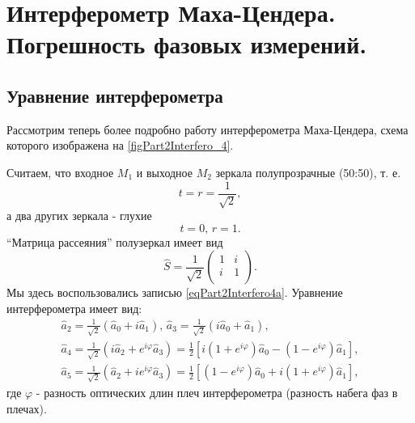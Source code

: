 \section{Интерферометр Маха-Цендера. Погрешность фазовых измерений.}
\subsection{Уравнение интерферометра}
Рассмотрим теперь более подробно работу интерферометра Маха-Цендера,
схема которого изображена на \autoref{figPart2Interfero_4}.



Считаем, что входное $M_1$ и выходное $M_2$ зеркала полупрозрачные
(50:50), т. е. 
\[
t = r = \frac{1}{\sqrt{2}},
\]
а два других зеркала - глухие
\[
t = 0, \, r = 1.
\]
``Матрица рассеяния'' полузеркал имеет вид 
\begin{equation}
\hat{S} = \frac{1}{\sqrt{2}} 
\left(
\begin{array}{cc}
1 & i \\
i & 1 \\
\end{array}
\right).
\nonumber
\end{equation}
Мы здесь воспользовались записью \eqref{eqPart2Interfero4a}. Уравнение
интерферометра имеет вид:
\begin{eqnarray}
\hat{a}_2 = \frac{1}{\sqrt{2}} \left(\hat{a}_0 + i \hat{a}_1\right),
\,
\hat{a}_3 = \frac{1}{\sqrt{2}} \left(i \hat{a}_0 + \hat{a}_1\right),
\nonumber \\
\hat{a}_4 = \frac{1}{\sqrt{2}} \left(i \hat{a}_2 + e^{i \varphi}
\hat{a}_3\right) = 
\frac{1}{2}\left[
i \left(1 + e^{i \varphi}\right)\hat{a}_0 -
\left(1 - e^{i \varphi}\right)\hat{a}_1
\right],
\nonumber \\
\hat{a}_5 = \frac{1}{\sqrt{2}} \left(\hat{a}_2 + i e^{i \varphi}
\hat{a}_3\right) = 
\frac{1}{2}\left[
\left(1 - e^{i \varphi}\right)\hat{a}_0 +
i \left(1 + e^{i \varphi}\right)\hat{a}_1
\right],
\label{eqPart2Interfero11}
\end{eqnarray}
где $\varphi$ - разность оптических длин плеч интерферометра (разность
набега фаз в плечах).

